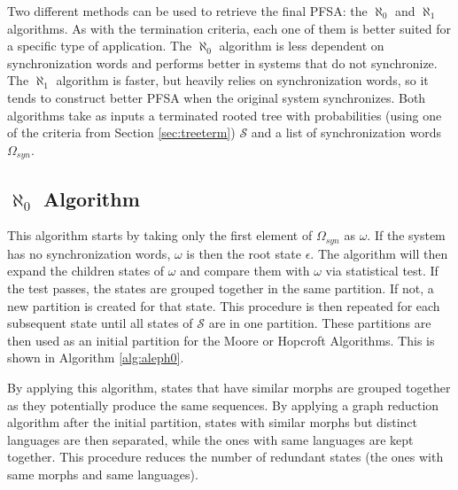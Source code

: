 {Two different methods can be used to retrieve the final PFSA: the $\aleph_0$ and $\aleph_1$ algorithms. As with the termination criteria, each one of them is better suited for a specific type of application. The $\aleph_0$ algorithm is less dependent on synchronization words and performs better in systems that do not synchronize. The $\aleph_1$ algorithm is faster, but heavily relies on synchronization words, so it tends to construct better PFSA when the original system synchronizes. Both algorithms take as inputs a terminated rooted tree with probabilities (using one of the criteria from Section \ref{sec:treeterm}) $\mathcal{S}$ and a list of synchronization words $\Omega_{syn}$.

\subsection{$\aleph_0$ Algorithm}

This algorithm starts by taking only the first element of $\Omega_{syn}$ as $\omega$. If the system has no synchronization words, $\omega$ is then the root state $\epsilon$. The algorithm will then expand the children states of $\omega$ and compare them with $\omega$ via statistical test. If the test passes, the states are grouped together in the same partition. If not, a new partition is created for that state. This procedure is then repeated for each subsequent state until all states of $\mathcal{S}$ are in one partition. These partitions are then used as an initial partition for the Moore or Hopcroft Algorithms. This is shown in Algorithm \ref{alg:aleph0}.

By applying this algorithm, states that have similar morphs are grouped together as they potentially produce the same sequences. By applying a graph reduction algorithm after the initial partition, states with similar morphs but distinct languages are then separated, while the ones with same languages are kept together. This procedure reduces the number of redundant states (the ones with same morphs and same languages).

}
